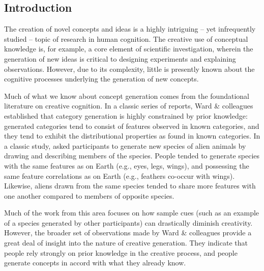 \documentclass[12pt]{article}
\begin{document}
\begin{flushleft}

\section{Introduction}
\setlength\parindent{0.5in}


The creation of novel concepts and ideas is a highly intriguing -- yet infrequently studied -- topic of research in human cognition. The creative use of conceptual knowledge is, for example, a core element of scientific investigation, wherein the generation of new ideas is critical to designing experiments and explaining observations. However, due to its complexity, little is presently known about the cognitive processes underlying the generation of new concepts. 

Much of what we know about concept generation comes from the foundational literature on creative cognition. In a classic series of reports, Ward \& colleagues \citep{ward1995s,ward1994structured,marsh1999inadvertent,ward2002role,smith1993constraining} established that category generation is highly constrained by prior knowledge: generated categories tend to consist of features observed in known categories, and they tend to exhibit the distributional properties as found in known categories. In a classic study, \cite{ward1994structured} asked participants to generate new species of alien animals by drawing and describing members of the species. People tended to generate species with the same features as on Earth (e.g., eyes, legs, wings), and possessing the same feature correlations as on Earth (e.g., feathers co-occur with wings). Likewise, aliens drawn from the same species tended to share more features with one another compared to members of opposite species. 

Much of the work from this area \citep[e.g.,][]{smith1993constraining,marsh1999inadvertent} focuses on how sample cues (such as an example of a species generated by other participants) can drastically diminish creativity. However, the broader set of observations made by Ward \& colleagues provide a great deal of insight into the nature of creative generation. They indicate that people rely strongly on prior knowledge in the creative process, and people generate concepts in accord with what they already know. 


\end{flushleft}
\end{document}
